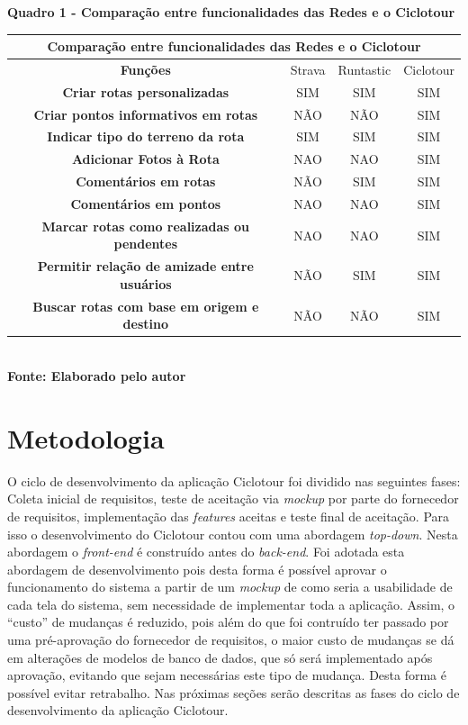    \begin{center}
          \centering
       	\textbf{Quadro 1 - Comparação entre funcionalidades das Redes e o Ciclotour}\\
        \label{quadro1}
	\begin{tabular}{|c|c|c|c|} \hline
	\multicolumn{4}{|c|}{\textbf{Comparação entre funcionalidades das Redes e o Ciclotour }} 	  \\
		\hline \textbf{ Funções } & Strava & Runtastic & Ciclotour \\  
		\hline \textbf{ Criar rotas personalizadas } & SIM & SIM & SIM \\ 
		\hline \textbf{ Criar pontos informativos em rotas } & NÃO & NÃO & SIM  \\
		\hline \textbf{ Indicar tipo do terreno da rota } & SIM & SIM & SIM \\ 
		\hline \textbf{	Adicionar Fotos à Rota } & NAO & NAO & SIM \\ 
		\hline \textbf{ Comentários em rotas }	& NÃO & SIM & SIM \\ 
		\hline \textbf{	Comentários em pontos } & NAO & NAO & SIM \\ 
		\hline \textbf{	Marcar rotas como realizadas ou pendentes } & NAO & NAO & SIM \\ 
		\hline \textbf{	Permitir relação de amizade entre usuários } & NÃO & SIM & SIM \\ 
		\hline \textbf{	Buscar rotas com base em origem e destino } & NÃO & NÃO & SIM \\ 
		\hline
	\end{tabular}
	\vspace{0.1cm} 
	{\footnotesize\\ \textbf{Fonte: Elaborado pelo autor}}
   \end{center}

\section{\esp Metodologia}
O ciclo de desenvolvimento da aplicação Ciclotour foi dividido nas seguintes fases: Coleta inicial de requisitos, teste de aceitação via 
\textit{mockup} por parte do fornecedor de requisitos, implementação das \textit{features} aceitas e teste final de aceitação. Para isso 
o desenvolvimento do Ciclotour contou com uma abordagem \textit{top-down}. Nesta abordagem o \textit{front-end} é construído antes do 
\textit{back-end}. Foi adotada esta abordagem de desenvolvimento pois desta forma é possível aprovar o funcionamento do sistema a partir de um 
\textit{mockup} de como seria a usabilidade de cada tela do sistema, sem necessidade de implementar toda a aplicação. Assim, o ``custo'' de mudanças 
é reduzido, pois além do que foi contruído ter passado por uma pré-aprovação do fornecedor de requisitos, o maior custo de mudanças se dá em 
alterações de modelos de banco de dados, que só será implementado após aprovação, evitando que sejam necessárias este tipo de mudança. Desta forma é 
possível evitar retrabalho. Nas próximas seções serão descritas as fases do ciclo de desenvolvimento da aplicação Ciclotour.

